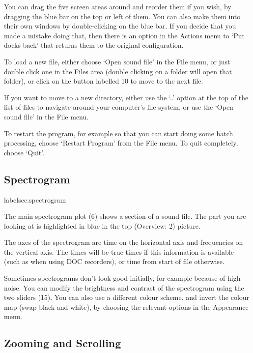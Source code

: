 \documentclass{article}
\begin{document}
You can drag the five screen areas around and reorder them if you wish, by dragging the blue bar on the top or left of them. You can also make them into their own windows by double-clicking on the blue bar. If you decide that you made a mistake doing that, then there is an option in the Actions menu to `Put docks back' that returns them to the original configuration.

To load a new file, either choose `Open sound file' in the File menu, or just double click one in the Files area (double clicking on a folder will open that folder), or click on the button labelled 10 to move to the next file.

If you want to move to a new directory, either use the `..' option at the top of the list of files to navigate around your computer's file system, or use the  `Open sound file' in the File menu.

To restart the program, for example so that you can start doing some batch processing, choose `Restart Program' from the File menu. To quit completely, choose `Quit'. 


\subsection{Spectrogram}label{sec:spectrogram}

The main spectrogram plot (6) shows a section of a sound file. The part you are looking at is highlighted in blue in the top (Overview: 2) picture.

The axes of the spectrogram are time on the horizontal axis and frequencies on the vertical axis. The times will be true times if this information is available (such as when using DOC recorders), or time from start of file otherwise. 

Sometimes spectrograms don't look good initially, for example because of high noise. You can modify the brightness and contrast of the spectrogram using the two sliders (15). You can also use a different colour scheme, and invert the colour map (swap black and white), by choosing the relevant options in the Appearance menu.

\subsection{Zooming and Scrolling}
\end{document}

